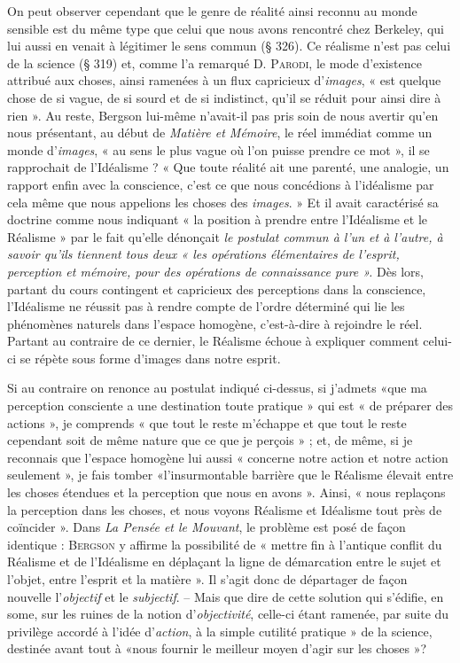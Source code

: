 On peut observer cependant que le genre de réalité ainsi reconnu
au monde sensible est du même type que celui que nous avons rencontré
chez Berkeley, qui lui aussi en venait à légitimer le sens
commun (§ 326). Ce réalisme n’est pas celui de la science (§ 319) et,
comme l’a remarqué D. \textsc{Parodi}, le mode d’existence attribué aux
choses, ainsi ramenées à un flux capricieux d'{\it images}, « est quelque chose
de si vague, de si sourd et de si indistinct, qu’il se réduit pour ainsi
dire à rien ». Au reste, Bergson lui-même n’avait-il pas pris soin de
nous avertir qu’en nous présentant, au début de {\it Matière et Mémoire},
le réel immédiat comme un monde d'{\it images}, « au sens le plus vague
où l’on puisse prendre ce mot », il se rapprochait de l’Idéalisme ?
« Que toute réalité ait une parenté, une analogie, un rapport enfin
avec la conscience, c’est ce que nous concédions à l’idéalisme par cela
même que nous appelions les choses des {\it images}. » Et il avait caractérisé
sa doctrine comme nous indiquant « la position à prendre entre
l’Idéalisme et le Réalisme » par le fait qu’elle dénonçait {\it le postulat
commun à l’un et à l’autre, à savoir qu’ils tiennent tous deux « les opérations
élémentaires de l'esprit, perception et mémoire, pour des opérations
de connaissance pure ».} Dès lors, partant du cours contingent et capricieux
des perceptions dans la conscience, l’Idéalisme ne réussit pas
à rendre compte de l’ordre déterminé qui lie les phénomènes naturels
dans l’espace homogène, c’est-à-dire à rejoindre le réel. Partant au
contraire de ce dernier, le Réalisme échoue à expliquer comment
celui-ci se répète sous forme d’images dans notre esprit.

Si au contraire on renonce au postulat indiqué ci-dessus, si j’admets
«que ma perception consciente a une destination toute pratique »
qui est « de préparer des actions », je comprends « que tout le reste
m’échappe et que tout le reste cependant soit de même nature que
ce que je perçois » ; et, de même, si je reconnais que l’espace homogène
lui aussi « concerne notre action et notre action seulement », je fais
tomber «l’insurmontable barrière que le Réalisme élevait entre les
choses étendues et la perception que nous en avons ». Ainsi, « nous
replaçons la perception dans les choses, et nous voyons Réalisme et
Idéalisme tout près de coïncider ». Dans {\it La Pensée et le Mouvant}, le
problème est posé de façon identique : \textsc{Bergson} y affirme la possibilité
de « mettre fin à l'antique conflit du Réalisme et de l’Idéalisme
en déplaçant la ligne de démarcation entre le sujet et l’objet, entre
l'esprit et la matière ». Il s’agit donc de départager de façon nouvelle
l'{\it objectif} et le {\it subjectif}. -- Mais que dire de cette solution qui s’édifie,
en some, sur les ruines de la notion d’{\it objectivité}, celle-ci étant ramenée,
par suite du privilège accordé à l’idée d'{\it action}, à la simple cutilité
pratique » de la science, destinée avant tout à «nous fournir le meilleur
moyen d’agir sur les choses »?

